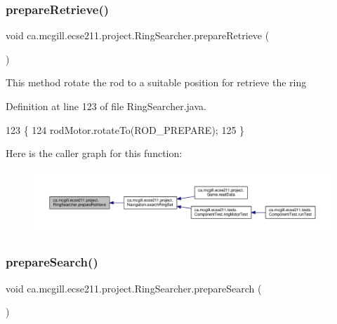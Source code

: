 \subsubsection{\texorpdfstring{prepare\+Retrieve()}{prepareRetrieve()}}
{\footnotesize\ttfamily void ca.\+mcgill.\+ecse211.\+project.\+Ring\+Searcher.\+prepare\+Retrieve (\begin{DoxyParamCaption}{ }\end{DoxyParamCaption})}

This method rotate the rod to a suitable position for retrieve the ring 

Definition at line 123 of file Ring\+Searcher.\+java.


\begin{DoxyCode}
123                                 \{
124     rodMotor.rotateTo(ROD\_PREPARE);
125   \}
\end{DoxyCode}
Here is the caller graph for this function\+:
\nopagebreak
\begin{figure}[H]
\begin{center}
\leavevmode
\includegraphics[width=350pt]{classca_1_1mcgill_1_1ecse211_1_1project_1_1_ring_searcher_a3de30b85b1445157d7f8572992de7651_icgraph}
\end{center}
\end{figure}
\mbox{\label{classca_1_1mcgill_1_1ecse211_1_1project_1_1_ring_searcher_abf31c36cadb144a4651b11f7fa37120a}} 
\subsubsection{\texorpdfstring{prepare\+Search()}{prepareSearch()}}
{\footnotesize\ttfamily void ca.\+mcgill.\+ecse211.\+project.\+Ring\+Searcher.\+prepare\+Search (\begin{DoxyParamCaption}{ }\end{DoxyParamCaption})}

